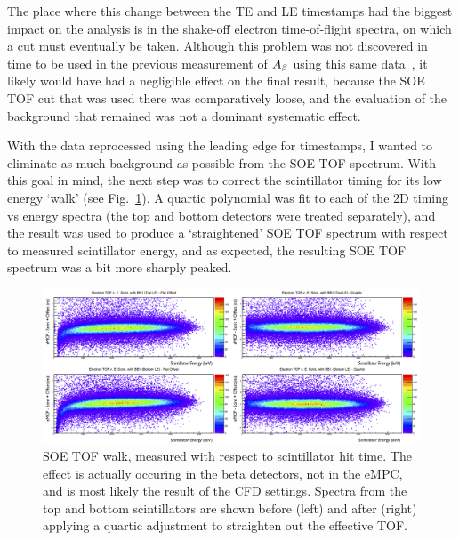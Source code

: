 The place where this change between the TE and LE timestamps had the biggest impact on the analysis is in the shake-off electron time-of-flight spectra, on which a cut must eventually be taken. Although this problem was not discovered in time to be used in the previous measurement of $A_{\beta}$ using this same data~\cite{ben_Abeta}, it likely would have had a negligible effect on the final result, because the SOE TOF cut that was used there was comparatively loose, and the evaluation of the background that remained was not a dominant systematic effect. 

With the data reprocessed using the leading edge for timestamps, I wanted to eliminate as much background as possible from the SOE TOF spectrum.  With this goal in mind, the next step was to correct the scintillator timing for its low energy `walk' (see Fig.~\ref{fig:WalkAdjust}).  A quartic polynomial was fit to each of the 2D timing vs energy spectra (the top and bottom detectors were treated separately), and the result was used to produce a `straightened' SOE TOF spectrum with respect to measured scintillator energy, and as expected, the resulting SOE TOF spectrum was a bit more sharply peaked.  


\begin{figure}[h!!tb]
	\centering
	\includegraphics[width=.999\linewidth]
	{Figures/WalkAdjust.png}
	\caption[SOE TOF Walk and Correction]{SOE TOF walk, measured with respect to scintillator hit time.  The effect is actually occuring in the beta detectors, not in the eMPC, and is most likely the result of the \ac{CFD} settings.  Spectra from the top and bottom scintillators are shown before (left) and after (right) applying a quartic adjustment to straighten out the effective TOF.}	
	\label{fig:WalkAdjust}
\end{figure}



